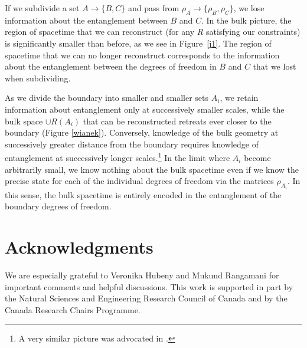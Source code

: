 \documentclass[12pt]{article}
\renewcommand{\(}{\left(}
\renewcommand{\)}{\right)}
\begin{document}
If we subdivide a set $A \to \{B,C\}$ and pass from $\rho_A \to \{\rho_B,\rho_C\}$, we lose information about the entanglement between $B$ and $C$. In the bulk picture, the region of spacetime that we can reconstruct (for any $R$ satisfying our constraints) is significantly smaller than before, as we see in Figure~\ref{j1}. The region of spacetime that we can no longer reconstruct corresponds to the information about the entanglement between the degrees of freedom in $B$ and $C$ that we lost when subdividing.

As we divide the boundary into smaller and smaller sets $A_i$, we retain information about entanglement only at successively smaller scales, while the bulk space $\cup R(A_i)$ that can be reconstructed retreats ever closer to the boundary (Figure \ref{wianek}). Conversely, knowledge of the bulk geometry at successively greater distance from the boundary requires knowledge of entanglement at successively longer scales.\footnote{A very similar picture was advocated in \cite{swingle}.} In the limit where $A_i$ become arbitrarily small, we know nothing about the bulk spacetime even if we know the precise state for each of the individual degrees of freedom via the matrices $\rho_{A_i}$.
In this sense, the bulk spacetime is entirely encoded in the entanglement of the boundary degrees of freedom.

\section*{Acknowledgments}

We are especially grateful to Veronika Hubeny and Mukund Rangamani for important comments and helpful discussions. This work is supported in part by the Natural Sciences and Engineering Research Council of Canada and by the Canada Research Chairs Programme.
\end{document}
